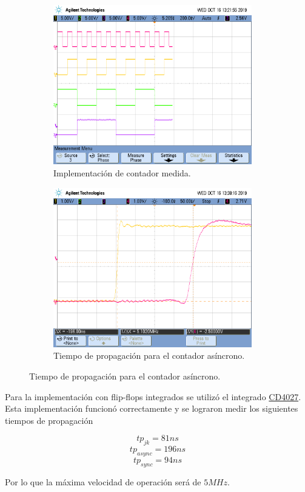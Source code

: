 \begin{figure}[H]
\begin{subfigure}{0.49\textwidth}
	\centering
	\includegraphics[width=0.95\textwidth,trim={0 2.2cm 0.1cm 1.75cm},clip]{Imagenes/counter.png}
	\caption{Implementación de contador medida.}
	\label{counterr}
\end{subfigure}
\begin{subfigure}{0.49\textwidth}
	\centering
	\includegraphics[width=0.95\textwidth,trim={0 2.2cm 0.1cm 1.75cm},clip]{Imagenes/counter1.png}
	\caption{Tiempo de propagación para el contador asíncrono.}
	\label{countersadr}
\end{subfigure}
\end{figure}

Para la implementación con flip-flops integrados se utilizó el integrado \href{http://www.sycelectronica.com.ar/semiconductores/CD4027.pdf}{CD4027}. Esta implementación funcionó correctamente y se lograron medir los siguientes tiempos de propagación

$$tp_{jk}=81ns$$
$$tp_{async}=196ns$$
$$tp_{sync}=94ns$$

Por lo que la máxima velocidad de operación será de $5MHz$.

